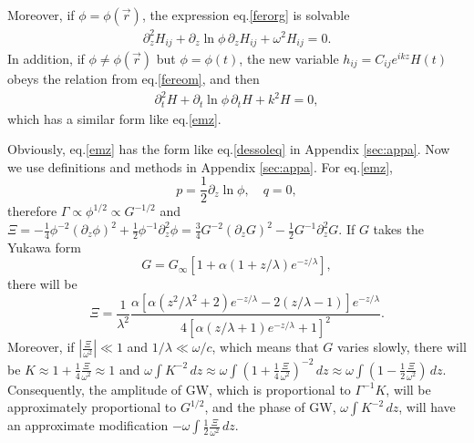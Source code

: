 \documentclass[
    jor,
    amsmath,amssymb,preprint,
    superscriptaddress,
]{revtex4-2}
\begin{document}
Moreover, if $\phi = \phi(\vec{r})$, the expression eq.\eqref{ferorg} is solvable
\begin{equation}\label{emz}
\begin{aligned}
\partial_z^2 H_{ij} + \partial_z \ln\phi\,\partial_z H_{ij} + \omega^2 H_{ij} = 0.
\end{aligned}
\end{equation}
In addition, if $\phi \neq \phi(\vec{r})$ but $\phi = \phi(t)$, the new variable $h_{ij} = C_{ij}e^{ikz}H(t)$ obeys the relation from eq.\eqref{fereom}, and then
\begin{equation}\label{emt}
\begin{aligned}
\partial_t^2 H + \partial_t\ln\phi \,\partial_t H  + k^2H= 0,
\end{aligned}
\end{equation}
which has a similar form like eq.\eqref{emz}.

Obviously, eq.\eqref{emz} has the form like eq.\eqref{dessoleq} in Appendix \ref{sec:appa}. Now we use definitions and methods in Appendix \ref{sec:appa}. For eq.\eqref{emz},
\begin{equation}
    p=\frac{1}{2}\partial_z \ln\phi,\quad q=0,
\end{equation}
therefore $\Gamma\propto\phi^{1/2}\propto G^{-1/2}$ and $\Xi=-\frac{1}{4}\phi^{-2}(\partial_z\phi)^2+\frac{1}{2}\phi^{-1}\partial_z^2\phi=\frac{3}{4}G^{-2}(\partial_zG)^2-\frac{1}{2}G^{-1}\partial_z^2G$. If $G$ takes the Yukawa form
\begin{equation}\label{Yukawa}
    G=G_\infty[1+\alpha(1+z/\lambda)e^{-z/\lambda}],
\end{equation}
there will be
\begin{equation}
    \Xi=\frac{1}{\lambda^2}\frac{\alpha[\alpha(z^2/\lambda^2+2)e^{-z/\lambda}-2(z/\lambda-1)]e^{-z/\lambda}}{4[\alpha(z/\lambda+1)e^{-z/\lambda}+1]^2}.
\end{equation}
Moreover, if $\left\lvert\frac{ \Xi}{\omega^2}\right\rvert \ll 1$ and $1/\lambda\ll\omega/c$, which means that $G$ varies slowly, there will be $K\approx1+\frac{1}{4}\frac{\Xi}{\omega^2}\approx1$ and $\omega\int K^{-2}\,d z\approx\omega\int (1+\frac{1}{4}\frac{\Xi}{\omega^2})^{-2}\,d z\approx\omega\int (1-\frac{1}{2}\frac{\Xi}{\omega^2})\,d z$. Consequently, the amplitude of GW, which is proportional to $\Gamma^{-1}K$, will be approximately proportional to $G^{1/2}$, and the phase of GW, $\omega\int K^{-2}\,d z$, will have an approximate modification $-\omega\int \frac{1}{2}\frac{\Xi}{\omega^2}\,d z$.
\end{document}
